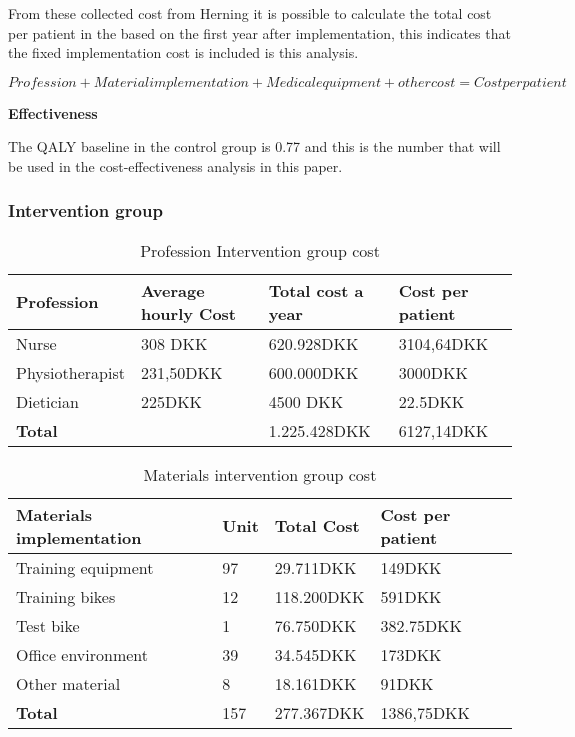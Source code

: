 From these collected cost from Herning it is possible to calculate the total cost per patient in the based on the first year after implementation, this indicates that the fixed implementation cost is included is this analysis.

$$Profession + Material implementation + Medical equipment + other cost = Cost per patient$$

\textbf{Effectiveness}

 The QALY baseline in the control group is 0.77 and this is the number that will be used in the cost-effectiveness analysis in this paper\cite{costeffect}. 

\subsubsection{Intervention group}

\begin{table}[H]
\begin{longtabu} to 
    \textbf{Profession} & \textbf{Average hourly Cost} & \textbf{Total cost a year} & \textbf{Cost per patient} \\[-1ex]
    \midrule
     Nurse   &    308 DKK & 620.928DKK & 3104,64DKK \\ \hline
    Physiotherapist   &   231,50DKK  & 600.000DKK & 3000DKK \\ \hline
    Dietician   &  225DKK &    4500 DKK    & 22.5DKK \\ 
    \hline \hline \hline
    \textbf{Total} & & 1.225.428DKK & 6127,14DKK
    \newline
   \end{longtabu}
\caption{Profession Intervention group cost}
\label{tab: PI}
\end{table}

\begin{table}[H]
\begin{longtabu} to 
    \textbf{Materials implementation} & \textbf{Unit} &\textbf{Total Cost} & \textbf{Cost per patient} \\[-1ex]
    \midrule
    Training equipment   &  97 &  29.711DKK & 149DKK \\ \hline
    Training bikes   & 12 & 118.200DKK & 591DKK  \\ \hline
    Test bike    &  1 & 76.750DKK &   382.75DKK \\ \hline 
    Office environment    &  39 & 34.545DKK  &   173DKK  \\ \hline 
    Other material   &  8 & 18.161DKK  &   91DKK\\
    \hline \hline \hline
    \textbf{Total} & 157 & 277.367DKK & 1386,75DKK
    \newline
   \end{longtabu}
\caption{Materials intervention group cost}
\label{tab: MI}
\end{table}

